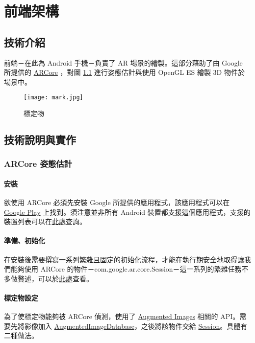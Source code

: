 \chapter{前端架構}
\section{技術介紹}

前端－在此為 Android 手機－負責了 AR 場景的繪製。這部分藉助了由 Google 所提供的 \href{https://developers.google.com/ar}{ARCore} ，對圖 \ref{fig:標定物} 進行姿態估計與使用 OpenGL ES 繪製 3D 物件於場景中。

\begin{figure}[h]
    \centering
    \texttt{[image: mark.jpg]}
    \caption{標定物}
    \label{fig:標定物}
\end{figure}

\section{技術說明與實作}
\subsection{ARCore 姿態估計}
\subsubsection{安裝}

欲使用 ARCore 必須先安裝 Google 所提供的應用程式，該應用程式可以在 \href{https://play.google.com/store/apps/details?id=com.google.ar.core}{Google Play} 上找到。須注意並非所有 Android 裝置都支援這個應用程式，支援的裝置列表可以在\href{https://developers.google.com/ar/discover/supported-devices#google_play_device}{此處}查詢。

\subsubsection{準備、初始化}

在安裝後需要撰寫一系列繁雜且固定的初始化流程，才能在執行期安全地取得讓我們能夠使用 ARCore 的物件－com.google.ar.core.Session－這一系列的繁雜任務不多做贅述，可以於\href{https://developers.google.com/ar/develop/java/enable-arcore}{此處}查看。

\subsubsection{標定物設定}

為了使標定物能夠被 ARCore 偵測，使用了 \href{https://developers.google.com/ar/develop/java/augmented-images}{Augmented Images} 相關的 API。需要先將影像加入 \href{https://developers.google.com/ar/reference/java/com/google/ar/core/AugmentedImageDatabase}{AugmentedImageDatabase}，之後將該物件交給 \href{https://developers.google.com/ar/reference/java/com/google/ar/core/Session}{Session}。具體有二種做法。

